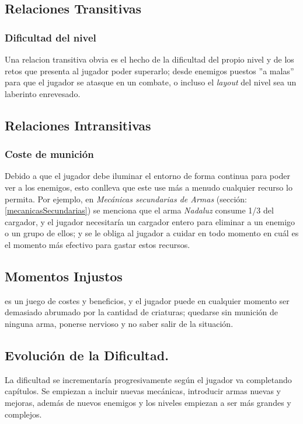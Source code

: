     \subsection{Relaciones Transitivas}
        \subsubsection{Dificultad del nivel}
            Una relacion transitiva obvia es el hecho de la dificultad del propio nivel y de los retos que presenta al jugador poder superarlo; desde enemigos puestos ''a malas'' para que el jugador se atasque en un combate, o incluso el \textit{layout} del nivel sea un laberinto enrevesado.

    \subsection{Relaciones Intransitivas}
        \subsubsection{Coste de munición}
        Debido a que el jugador debe iluminar el entorno de forma continua para poder ver a los enemigos, esto conlleva que este use más a menudo cualquier recurso lo permita. Por ejemplo, en \textit{Mecánicas secundarias de Armas} (sección: \ref{mecanicasSecundarias}) se menciona que el arma \textit{Nadaluz} consume 1/3 del cargador, y el jugador necesitaría un cargador entero para eliminar a un enemigo o un grupo de ellos; y se le obliga al jugador a cuidar en todo momento en cuál es el momento más efectivo para gastar estos recursos.
    \subsection{Momentos Injustos}
        \TWD es un juego de costes y beneficios, y el jugador puede en cualquier momento ser demasiado abrumado por la cantidad de criaturas; quedarse sin munición de ninguna arma, ponerse nervioso y no saber salir de la situación.
    \subsection{Evolución de la Dificultad.}
        La dificultad se incrementaría progresivamente según el jugador va completando capítulos. Se empiezan a incluir nuevas mecánicas, introducir armas nuevas y mejoras, además de nuevos enemigos y los niveles empiezan a ser más grandes y complejos.

